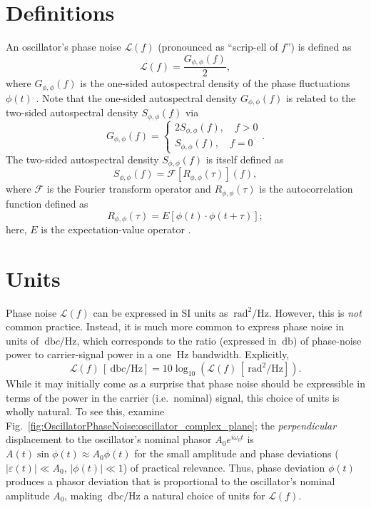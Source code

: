 \section{Definitions}
An oscillator's phase noise $\mathcal{L}(f)$
(pronounced as ``scrip-ell of $f$'')
is defined as
\begin{equation}
  \mathcal{L}(f)
  =
  \frac{G_{\phi,\phi}(f)}{2},
\end{equation}
where $G_{\phi,\phi}(f)$ is
the one-sided autospectral density of the phase fluctuations $\phi(t)$
\cite{ieee_std1139}.
Note that the one-sided autospectral density $G_{\phi,\phi}(f)$
is related to the two-sided autospectral density $S_{\phi,\phi}(f)$ via
\begin{equation}
  G_{\phi, \phi}(f)
  =
  \begin{cases}
    2 S_{\phi, \phi}(f), \quad f > 0
    \\
    S_{\phi, \phi}(f), \quad f = 0
  \end{cases}.
\end{equation}
The two-sided autospectral density $S_{\phi,\phi}(f)$ is itself defined as
\begin{equation}
  S_{\phi,\phi}(f)
  =
  \mathcal{F}\left[ R_{\phi,\phi}(\tau) \right](f),
\end{equation}
where $\mathcal{F}$ is the Fourier transform operator and
$R_{\phi,\phi}(\tau)$ is the autocorrelation function defined as
\begin{equation}
  R_{\phi,\phi}(\tau)
  =
  E\left[ \phi(t) \cdot \phi(t + \tau) \right];
\end{equation}
here, $E$ is the expectation-value operator
\cite[Ch.~5]{bendat_and_piersol}.


\section{Units}
Phase noise $\mathcal{L}(f)$ can be expressed in SI units
as $\SI{}{\radian\squared\per\hertz}$.
However, this is \emph{not} common practice.
Instead, it is much more common to express phase noise in units of
$\SI{}{\decibel c \per\hertz}$, which
corresponds to the ratio (expressed in $\SI{}{\decibel}$)
of phase-noise power to carrier-signal power
in a one $\SI{}{\hertz}$ bandwidth.
Explicitly,
\begin{equation}
  \mathcal{L}(f) \, [\SI{}{\decibel c \per\hertz}]
  =
  10 \log_{10} \left(%
    \mathcal{L}(f) \, [\SI{}{\radian\squared\per\hertz}]
  \right).
\end{equation}
While it may initially come as a surprise that
phase noise should be expressible in terms
of the power in the carrier (i.e.\ nominal) signal,
this choice of units is wholly natural.
To see this, examine
Fig.~\ref{fig:OscillatorPhaseNoise:oscillator_complex_plane};
the \emph{perpendicular} displacement to
the oscillator's nominal phasor $A_0 e^{i \omega_0 t}$
is $A(t) \sin\phi(t) \approx A_0 \phi(t)$
for the small amplitude and phase deviations
($|\varepsilon(t)| \ll A_0$, $|\phi(t)| \ll 1$)
of practical relevance.
Thus, phase deviation $\phi(t)$ produces a phasor deviation
that is proportional to the oscillator's nominal amplitude $A_0$,
making $\SI{}{\decibel c \per\hertz}$
a natural choice of units for $\mathcal{L}(f)$.


